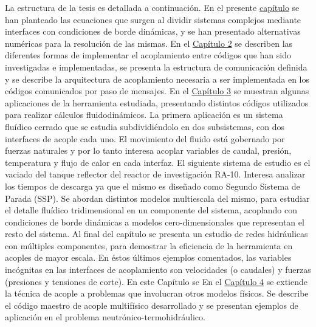 La estructura de la tesis es detallada a continuación.
En el presente \hyperlink{chapter.1}{capítulo} se han planteado las ecuaciones que surgen al dividir sistemas complejos mediante interfaces con condiciones de borde dinámicas,
y se han presentado alternativas numéricas para la resolución de las mismas.
En el \hyperlink{chapter.2}{Capítulo 2} se describen las diferentes formas de implementar el acoplamiento entre códigos que han sido investigadas e implementadas,
se presenta la estructura de comunicación definida y se describe la arquitectura de acoplamiento necesaria a ser implementada en los códigos comunicados por paso de mensajes.
En el \hyperlink{chapter.3}{Capítulo 3} se muestran algunas aplicaciones de la herramienta estudiada,
presentando distintos códigos utilizados para realizar cálculos fluidodinámicos.
La primera aplicación es un sistema fluídico cerrado que se estudia subdividiéndolo en dos subsistemas, con dos interfaces de acople cada uno.
El movimiento del fluido está gobernado por fuerzas naturales y por lo tanto interesa acoplar variables de 
caudal, presión, temperatura y flujo de calor en cada interfaz.
El siguiente sistema de estudio es el vaciado del tanque reflector del reactor de investigación RA-10.
Interesa analizar los tiempos de descarga ya que el mismo es diseñado como Segundo Sistema de Parada (SSP).
Se abordan distintos modelos multiescala del mismo, para estudiar el detalle fluídico tridimensional en un componente del sistema,
acoplando con condiciones de borde dinámicas a modelos cero-dimensionales que representan el resto del sistema.
Al final del capítulo se presenta un estudio de redes hidráulicas con múltiples componentes,
para demostrar la eficiencia de la herramienta en acoples de mayor escala.
En éstos últimos ejemplos comentados, las variables incógnitas en las interfaces de acoplamiento son velocidades (o caudales) y fuerzas (presiones y tensiones de corte).
En este Capítulo se 
En el \hyperlink{chapter.4}{Capítulo 4} se extiende la técnica de acople a problemas que involucran otros modelos físicos.
Se describe el código maestro de acople multifísico desarrollado y se presentan ejemplos de aplicación en el problema neutrónico-termohidráulico.

